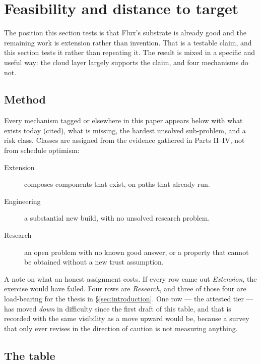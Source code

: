 \section{Feasibility and distance to target}
\label{sec:feasibility}

The position this section tests is that Flux's substrate is already good and the
remaining work is extension rather than invention. That is a testable claim, and this section tests
it rather than repeating it. The result is mixed in a specific and useful way: the cloud layer
largely supports the claim, and four mechanisms do not.

\subsection{Method}

Every mechanism tagged \planned or \vision elsewhere in this paper appears below with what exists
today (cited), what is missing, the hardest unsolved sub-problem, and a risk class. Classes are
assigned from the evidence gathered in Parts II--IV, not from schedule optimism:

\begin{description}
  \item[Extension] composes components that exist, on paths that already run.
  \item[Engineering] a substantial new build, with no unsolved research problem.
  \item[Research] an open problem with no known good answer, or a property that cannot be obtained
    without a new trust assumption.
\end{description}

A note on what an honest assignment costs. If every row came out \emph{Extension}, the exercise would
have failed. Four rows are \emph{Research}, and three of those four are load-bearing for the thesis in
\S\ref{sec:introduction}. One row --- the attested tier --- has moved \emph{down} in difficulty since
the first draft of this table, and that is recorded with the same visibility as a move upward would
be, because a survey that only ever revises in the direction of caution is not measuring anything.

\subsection{The table}

